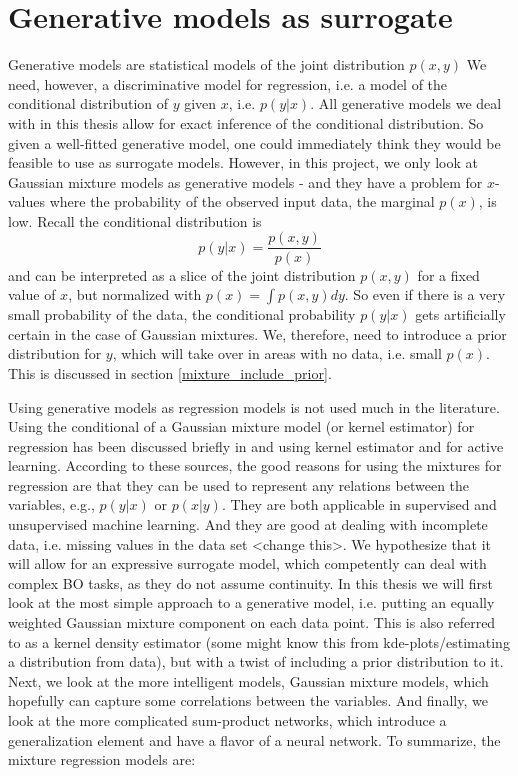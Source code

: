 \chapter{Generative models as surrogate}
Generative models are statistical models of the joint distribution $p(x,y)$ We need, however, a
discriminative model for regression, i.e. a model of the conditional distribution of $y$ given $x$,
i.e. $p(y|x)$. All generative models we deal with in this thesis allow for exact inference of the
conditional distribution. So given a well-fitted generative model, one could immediately think they
would be feasible to use as surrogate models. However, in this project, we only look at Gaussian
mixture models as generative models - and they have a problem for $x$-values where the probability
of the observed input data, the marginal $p(x)$, is low. Recall the conditional distribution is 
$$p(y|x) = \frac{p(x,y)}{p(x)}$$ and can be interpreted as a slice of the joint distribution
$p(x,y)$ for a fixed value of $x$, but normalized with $p(x) = \int p(x,y) dy$. So even if there is
a very small probability of the data, the conditional probability $p(y|x)$ gets artificially certain
in the case of Gaussian mixtures. We, therefore, need to introduce a prior distribution for $y$,
which will take over in areas with no data, i.e. small $p(x)$. This is discussed in section \ref{mixture_include_prior}.

Using generative models as regression models is not used much in the literature. Using the
conditional of a Gaussian mixture model (or kernel estimator) for regression has been discussed
briefly in \cite{bishop1995neural} and using kernel estimator \cite{ALStatisticalModels} and
\cite{JordanPaper} for active learning. According to these sources, the good reasons for using the
mixtures for regression are that they can be used to represent any relations between the variables,
e.g., $p(y|x)$ or $p(x|y)$. They are both applicable in supervised and unsupervised machine learning.
And they are good at dealing with incomplete data, i.e. missing values in the data set <change
this>. We hypothesize that it will allow for an expressive surrogate model, which competently
can deal with complex BO tasks, as they do not assume continuity. In this thesis we will first look
at the most simple approach to a generative model, i.e. putting an equally weighted Gaussian mixture
component on each data point. This is also referred to as a kernel density estimator (some might know this 
from kde-plots/estimating a distribution from data), but with a twist of including a prior
distribution to it. Next, we look at the more intelligent models, Gaussian mixture models, which
hopefully can capture some correlations between the variables. And finally, we look at the more
complicated sum-product networks, which introduce a generalization element and have a flavor of a
neural network. To summarize, the mixture regression models are:

